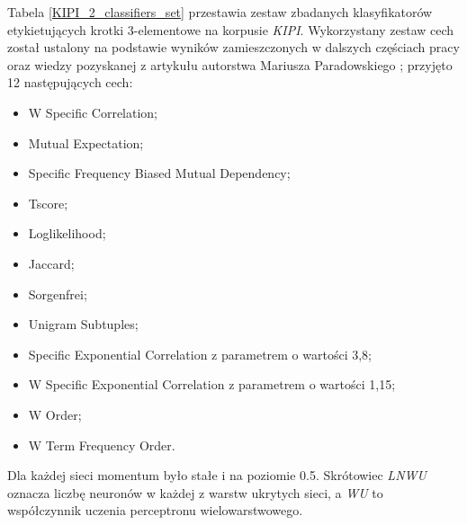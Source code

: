 Tabela \ref{KIPI_2_classifiers_set} przestawia zestaw zbadanych klasyfikatorów etykietujących krotki 3-elementowe na korpusie \emph{KIPI}.
Wykorzystany zestaw cech został ustalony na podstawie wyników zamieszczonych w dalszych częściach pracy oraz wiedzy pozyskanej z artykułu autorstwa Mariusza Paradowskiego \cite{paradowski_beta}; przyjęto 12 następujących cech:
\begin{itemize}
	\item W Specific Correlation;
	\item Mutual Expectation;
	\item Specific Frequency Biased Mutual Dependency;
	\item Tscore;
	\item Loglikelihood;
	\item Jaccard;
	\item Sorgenfrei;
	\item Unigram Subtuples;
	\item Specific Exponential Correlation z parametrem o wartości 3,8;
	\item W Specific Exponential Correlation z parametrem o wartości 1,15;
	\item W Order;
	\item W Term Frequency Order.
\end{itemize}

Dla każdej sieci momentum było stałe i na poziomie 0.5.
Skrótowiec \emph{LNWU} oznacza liczbę neuronów w każdej z warstw ukrytych sieci, a \emph{WU} to współczynnik uczenia perceptronu wielowarstwowego.


